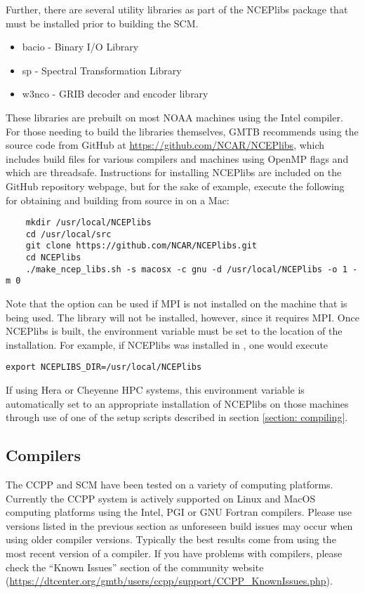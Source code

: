 Further, there are several utility libraries as part of the NCEPlibs package that must be installed prior to building the SCM. 
\begin{itemize}
    \item bacio - Binary I/O Library
    \item sp - Spectral Transformation Library
    \item w3nco - GRIB decoder and encoder library
\end{itemize}
These libraries are prebuilt on most NOAA machines using the Intel compiler. For those needing to build the libraries themselves, GMTB recommends using the source code from GitHub at \url{https://github.com/NCAR/NCEPlibs}, which includes build files for various compilers and machines using OpenMP flags and which are threadsafe. Instructions for installing NCEPlibs are included on the GitHub repository webpage, but for the sake of example, execute the following for obtaining and building from source in  on a Mac:
\begin{lstlisting}
    mkdir /usr/local/NCEPlibs
    cd /usr/local/src
    git clone https://github.com/NCAR/NCEPlibs.git
    cd NCEPlibs
    ./make_ncep_libs.sh -s macosx -c gnu -d /usr/local/NCEPlibs -o 1 -m 0
\end{lstlisting}
Note that the option  can be used if MPI is not installed on the machine that is being used. The  library will not be installed, however, since it requires MPI. Once NCEPlibs is built, the  environment variable must be set to the location of the installation. For example, if NCEPlibs was installed in , one would execute
\begin{lstlisting}
export NCEPLIBS_DIR=/usr/local/NCEPlibs
\end{lstlisting}
If using Hera or Cheyenne HPC systems, this environment variable is automatically set to an appropriate installation of NCEPlibs on those machines through use of one of the setup scripts described in section \ref{section: compiling}.


\subsection{Compilers}
The CCPP and SCM have been tested on a variety of
computing platforms. Currently the CCPP system is actively supported
on Linux and MacOS computing platforms using the Intel, PGI or GNU Fortran
compilers. Please use versions listed in the previous section as unforeseen
build issues may occur when using older compiler versions. Typically the best results come from using the
most recent version of a compiler. If you have problems with compilers, please check the ``Known Issues'' section of the
community website (\url{https://dtcenter.org/gmtb/users/ccpp/support/CCPP_KnownIssues.php}).

